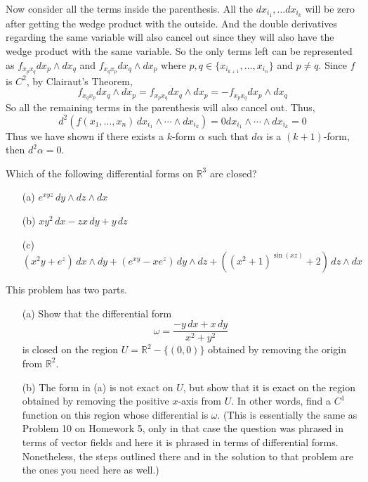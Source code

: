 \documentclass[11pt,letterpaper,cm]{nupset}
\begin{document}
\begin{solution}
	Now consider all the terms inside the parenthesis. All the $dx_{i_1},\ldots dx_{i_k}$ will be zero after getting the wedge product with the outside. And the double derivatives regarding the same variable will also cancel out since they will also have the wedge product with the same variable. So the only terms left can be represented as $f_{x_px_q}dx_p\wedge dx_q$ and $f_{x_qx_p}dx_q\wedge dx_p$ where $p,q\in\{x_{i_{k+1}},\ldots,x_{i_n}\}$ and $p\neq q$. Since $f$ is $C^2$, by Clairaut's Theorem,
	$$f_{x_qx_p}dx_q\wedge dx_p=f_{x_px_q}dx_q\wedge dx_p=-f_{x_px_q}dx_p\wedge dx_q$$
	So all the remaining terms in the parenthesis will also cancel out. Thus,
	$$d^2(f(x_1,\ldots,x_n)\,dx_{i_1}\wedge\cdots\wedge dx_{i_k})=0dx_{i_1}\wedge\cdots\wedge dx_{i_k}=0$$
	Thus we have shown if there exists a $k$-form $\alpha$ such that $d\alpha$ is a $(k+1)$-form, then $d^2\alpha=0$. 
\end{solution}
\newpage

\begin{problem}[Exercise 3] Which of the following differential forms on $\mathbb{R}^3$ are closed?
	
	\begin{itemize}
		\item[(a)] $e^{xyz}\,dy\wedge dz\wedge dx$
		\item[(b)] $xy^2\,dx - zx\,dy+y\,dz$
		\item[(c)] $(x^2y+e^z)\,dx\wedge dy + (e^{xy}-xe^z)\,dy\wedge dz + ((x^2+1)^{\sin(xz)}+2)\,dz\wedge dx$
	\end{itemize}
\end{problem}
\begin{solution}
\end{solution}
\newpage

\begin{problem}[Exercise 4] This problem has two parts.
	\begin{itemize}
		\item[(a)] Show that the differential form
		$$\omega = \frac{-y\,dx+x\,dy}{x^2+y^2}$$
		is closed on the region $U=\mathbb{R}^2-\{(0,0)\}$ obtained by removing the origin from $\mathbb{R}^2$. 
		\item[(b)] The form in (a) is not exact on $U$, but show that it is exact on the region obtained by removing the positive $x$-axis from $U$. In other words, find a $C^1$ function on this region whose differential is $\omega$. (This is essentially the same as Problem 10 on Homework 5, only in that case the question was phrased in terms of vector fields and here it is phrased in terms of differential forms. Nonetheless, the steps outlined there and in the solution to that problem are the ones you need here as well.)
	\end{itemize}
\end{problem}
\begin{solution}
\end{solution}
\newpage
\end{document}
